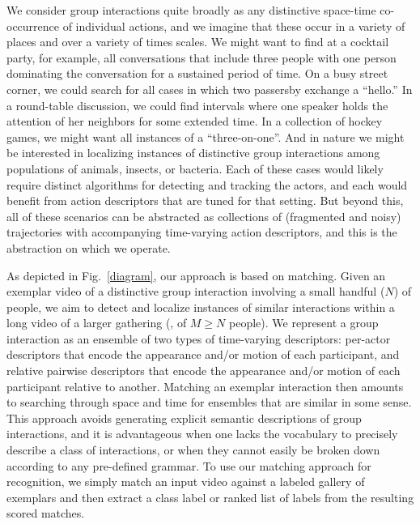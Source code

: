 We consider group interactions quite broadly as any distinctive space-time co-occurrence of individual actions, and we imagine that these occur in a variety of places and over a variety of times scales. We might want to find at a cocktail party, for example, all conversations that include three people with one person dominating the conversation for a sustained period of time. On a busy street corner, we could search for all cases in which two passersby exchange a ``hello.'' In a round-table discussion, we could find intervals where one speaker holds the attention of her neighbors for some extended time. In a collection of hockey games, we might want all instances of a ``three-on-one''. And in nature we might be interested in localizing instances of distinctive group interactions among populations of animals, insects, or bacteria. Each of these cases would likely require distinct algorithms for detecting and tracking the actors, and each would benefit from action descriptors that are tuned for that setting. But beyond this, all of these scenarios can be abstracted as collections of (fragmented and noisy) trajectories with accompanying time-varying action descriptors, and this is the abstraction on which we operate.
 
As depicted in Fig.~\ref{diagram}, our approach is based on matching. Given an exemplar video of a distinctive group interaction involving a small handful ($N$) of people, we aim to detect and localize instances of similar interactions within a long video of a larger gathering (\ie, of $M\ge N$ people). We represent a group interaction as an ensemble of two types of time-varying descriptors: per-actor descriptors that encode the appearance and/or motion of each participant, and relative pairwise descriptors that encode the appearance and/or motion of each participant relative to another. Matching an exemplar interaction then amounts to searching through space and time for ensembles that are similar in some sense. This approach avoids generating explicit semantic descriptions of group interactions, and it is advantageous when one lacks the vocabulary to precisely describe a class of interactions, or when they cannot easily be broken down according to any pre-defined grammar. To use our matching approach for recognition, we simply match an input video against a labeled gallery of exemplars and then extract a class label or ranked list of labels from the resulting scored matches.

